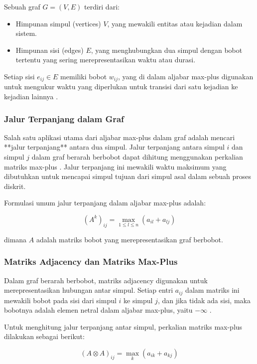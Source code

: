 \documentclass[12pt]{article}
\numberwithin{lemma}{subsection}
\begin{document}
Sebuah graf \( G = (V, E) \) terdiri dari:
\begin{itemize}
    \item Himpunan simpul (vertices) \( V \), yang mewakili entitas atau kejadian dalam sistem.
    \item Himpunan sisi (edges) \( E \), yang menghubungkan dua simpul dengan bobot tertentu yang sering merepresentasikan waktu atau durasi.
\end{itemize}

Setiap sisi \( e_{ij} \in E \) memiliki bobot \( w_{ij} \), yang di dalam aljabar max-plus digunakan untuk mengukur waktu yang diperlukan untuk transisi dari satu kejadian ke kejadian lainnya \cite{baccelli}.

\subsubsection{Jalur Terpanjang dalam Graf}

Salah satu aplikasi utama dari aljabar max-plus dalam graf adalah mencari **jalur terpanjang** antara dua simpul. Jalur terpanjang antara simpul \( i \) dan simpul \( j \) dalam graf berarah berbobot dapat dihitung menggunakan perkalian matriks max-plus \cite{heidergott}. Jalur terpanjang ini mewakili waktu maksimum yang dibutuhkan untuk mencapai simpul tujuan dari simpul asal dalam sebuah proses diskrit.

Formulasi umum jalur terpanjang dalam aljabar max-plus adalah:

\[
(A^k)_{ij} = \max_{1 \leq l \leq n} (a_{il} + a_{lj})
\]

dimana \( A \) adalah matriks bobot yang merepresentasikan graf berbobot.

\subsubsection{Matriks Adjacency dan Matriks Max-Plus}

Dalam graf berarah berbobot, matriks adjacency digunakan untuk merepresentasikan hubungan antar simpul. Setiap entri \( a_{ij} \) dalam matriks ini mewakili bobot pada sisi dari simpul \( i \) ke simpul \( j \), dan jika tidak ada sisi, maka bobotnya adalah elemen netral dalam aljabar max-plus, yaitu \( -\infty \) \cite{baccelli}.

Untuk menghitung jalur terpanjang antar simpul, perkalian matriks max-plus dilakukan sebagai berikut:

\[
(A \otimes A)_{ij} = \max_{k} (a_{ik} + a_{kj})
\]
\end{document}
